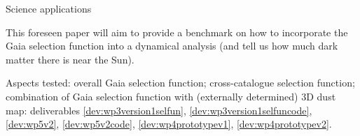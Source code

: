 \begin{workpackage}{Science applications}
\begin{wpobjectives}
\begin{description}
{        This foreseen paper will aim  to provide a benchmark on how to incorporate the Gaia selection function into a dynamical analysis (and tell us how much dark matter there is near the Sun).
        
        \textsf{Aspects tested: overall Gaia selection function; cross-catalogue selection function; combination of Gaia selection function with (externally determined) 3D dust map: deliverables \ref{dev:wp3version1selfun}, \ref{dev:wp3version1selfuncode}, \ref{dev:wp5v2}, \ref{dev:wp5v2code}, \ref{dev:wp4prototypev1}, \ref{dev:wp4prototypev2}.}    
    }
      
      
        
      

\end{description}
\end{wpobjectives}
\end{workpackage}
